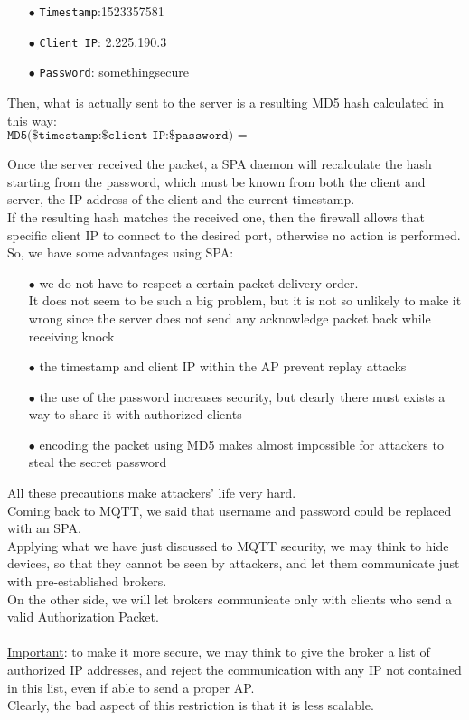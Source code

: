 \documentclass[12pt]{report}
\begin{document}
{{\begin{itemize}
\setlength{\itemindent}{+4mm}
\item[$\bullet$] \texttt{Timestamp}:1523357581
\item[$\bullet$] \texttt{Client IP}: 2.225.190.3
\item[$\bullet$] \texttt{Password}: somethingsecure
\end{itemize}

Then, what is actually sent to the server is a resulting MD5 hash calculated in this way:
\small
$$ \texttt{MD5(\$timestamp:\$client IP:\$password) = 35b45e73c99905b675ffb05b78714eb9} $$

\normalsize
Once the server received the packet, a SPA daemon will recalculate the hash starting from the password, which must be known from both the client and server, the IP address of the client and the current timestamp.\\
If the resulting hash matches the received one, then the firewall allows that specific client IP to connect to the desired port, otherwise no action is performed.\\
So, we have some advantages using SPA:

\begin{itemize}
\setlength{\itemindent}{+4mm}
\item[$\bullet$] we do not have to respect a certain packet delivery order.\\
It does not seem to be such a big problem, but it is not so unlikely to make it wrong since the server does not send any acknowledge packet back while receiving knock
\item[$\bullet$] the timestamp and client IP within the AP prevent replay attacks
\item[$\bullet$] the use of the password increases security, but clearly there must exists a way to share it with authorized clients
\item[$\bullet$] encoding the packet using MD5 makes almost impossible for attackers to steal the secret password
\end{itemize}

All these precautions make attackers' life very hard.\\

Coming back to MQTT, we said that username and password could be replaced with an SPA.\\
Applying what we have just discussed to MQTT security, we may think to hide devices, so that they cannot be seen by attackers, and let them communicate just with pre-established brokers.\\
On the other side, we will let brokers communicate only with clients who send a valid Authorization Packet.\\\\
\underline{Important}: to make it more secure, we may think to give the broker a list of authorized IP addresses, and reject the communication with any IP not contained in this list, even if able to send a proper AP.\\
Clearly, the bad aspect of this restriction is that it is less scalable.\\

}}
\end{document}

